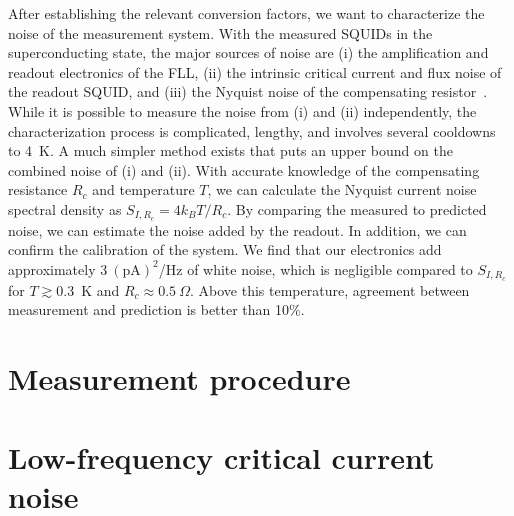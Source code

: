 After establishing the relevant conversion factors, we want to characterize the noise of the measurement system. With the measured SQUIDs in the superconducting state, the major sources of noise are (i) the amplification and readout electronics of the FLL, (ii) the intrinsic critical current and flux noise of the readout SQUID, and (iii) the Nyquist noise of the compensating resistor~\citep{Nyquist:PR:1928}. While it is possible to measure the noise from (i) and (ii) independently, the characterization process is complicated, lengthy, and involves several cooldowns to 4~K. A much simpler method exists that puts an upper bound on the combined noise of (i) and (ii). With accurate knowledge of the compensating resistance $R_c$ and temperature $T$, we can calculate the Nyquist current noise spectral density as $S_{I,R_c} = 4 k_B T/R_c$. By comparing the measured to predicted noise, we can estimate the noise added by the readout. In addition, we can confirm the calibration of the system. We find that our electronics add approximately $3~(\text{pA})^2$/Hz of white noise, which is negligible compared to $S_{I,R_c}$ for $T \gtrsim 0.3$~K and $R_c \approx 0.5~\Omega$. Above this temperature, agreement between measurement and prediction is better than 10\%.




\section{Measurement procedure}\label{chap:exp:sec:meas_proc}




\section{Low-frequency critical current noise}










